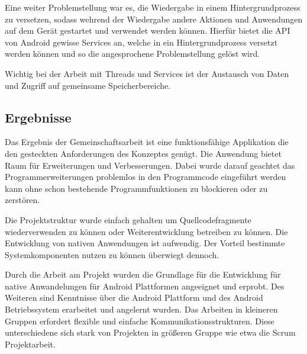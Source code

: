 Eine weiter Problemstellung war es, die Wiedergabe in einem Hintergrundprozess zu versetzen, sodass wehrend der Wiedergabe andere Aktionen und Anwendungen auf dem Gerät gestartet und verwendet werden können. Hierfür bietet die API von Android gewisse Services an, welche in ein Hintergrundprozess versetzt werden können und so die angesprochene Problemstellung gelöst wird.

Wichtig bei der Arbeit mit Threads und Services ist der Austausch von Daten und Zugriff auf gemeinsame Speicherbereiche.

\subsection{Ergebnisse}

Das Ergebnis der Gemeinschaftsarbeit ist eine funktionsfähige Applikation die den gesteckten Anforderungen des Konzeptes genügt. Die Anwendung bietet Raum für Erweiterungen und Verbesserungen. Dabei wurde darauf geachtet das Programmerweiterungen problemlos in den Programmcode eingeführt werden kann ohne schon bestehende Programmfunktionen zu blockieren oder zu zerstören.

Die Projektstruktur wurde einfach gehalten um Quellcodefragmente wiederverwenden zu können oder Weiterentwicklung betreiben zu können. Die Entwicklung von nativen Anwendungen ist aufwendig. Der Vorteil bestimmte Systemkomponenten nutzen zu können überwiegt dennoch.

Durch die Arbeit am Projekt wurden die Grundlage für die Entwicklung für native Anwandelungen für Android Plattformen angeeignet und erprobt. Des Weiteren sind Kenntnisse über die Android Plattform und des Android Betriebssystem erarbeitet und angelernt wurden. Das Arbeiten in kleineren Gruppen erfordert flexible und einfache Kommunikationsstrukturen. Diese unterschiedene sich stark von Projekten in größeren Gruppe wie etwa die Scrum\cite{9783868998337} Projektarbeit.

